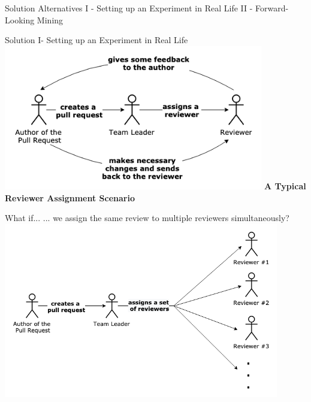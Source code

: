 \documentclass{beamer}
\begin{document}

    \begin{frame}[noframenumbering]{Solution Alternatives}
    I - Setting up an Experiment in Real Life\newline
    II - Forward-Looking Mining
    \end{frame}
    \begin{frame}[noframenumbering]{Solution I- Setting up an Experiment in Real Life}
        \centering\includegraphics[width=0.85\textwidth]{img/normal_review.png} \newline
        \centering\color[rgb]{0,0.325,0.627}\textbf{A Typical Reviewer Assignment Scenario}
    \end{frame}

    \begin{frame}[noframenumbering]{What if...}
        ... we assign the same review to multiple reviewers simultaneously?
        \centering\includegraphics[width=0.9\textwidth]{img/multiple_review.png}
    \end{frame}
\end{document}
